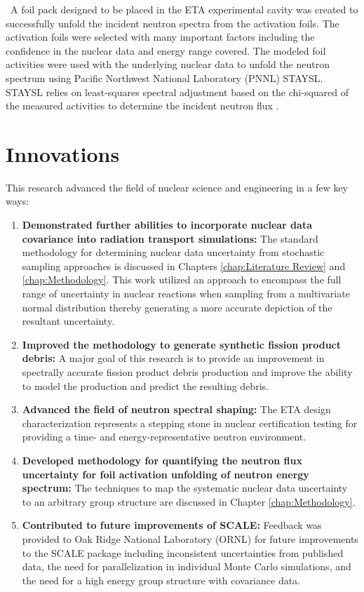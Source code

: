 \ A foil pack designed to be placed in the ETA experimental cavity was created to successfully unfold the incident neutron spectra from the activation foils. 
The activation foils were selected with many important factors including the confidence in the nuclear data and energy range covered. 
The modeled foil activities were used with the underlying nuclear data to unfold the neutron spectrum using Pacific Northwest National Laboratory (PNNL) STAYSL. 
STAYSL relies on least-squares spectral adjustment based on the chi-squared of the measured activities to determine the incident neutron flux \cite{Greenwood2016}. 

\section{Innovations}

This research advanced the field of nuclear science and engineering in a few key ways:

\begin{enumerate} 
\item \textbf{Demonstrated further abilities to incorporate nuclear data covariance into radiation transport simulations:}  
The standard methodology for determining nuclear data uncertainty from stochastic sampling approaches is discussed in Chapters \ref{chap:Literature Review} and \ref{chap:Methodology}. This work utilized an approach to encompass the full range of uncertainty in nuclear reactions when sampling from a multivariate normal distribution thereby generating a more accurate depiction of the resultant uncertainty. 
\item \textbf{Improved the methodology to generate synthetic fission product debris:}
A major goal of this research is to provide an improvement in spectrally accurate fission product debris production and improve the ability to model the production and predict the resulting debris. 
\item \textbf{Advanced the field of neutron spectral shaping:}
The ETA design characterization represents a stepping stone in nuclear certification testing for providing a time- and energy-representative neutron environment.
\item \textbf{Developed methodology for quantifying the neutron flux uncertainty for foil activation unfolding of neutron energy spectrum:}
The techniques to map the systematic nuclear data uncertainty to an arbitrary group structure are discussed in Chapter \ref{chap:Methodology}. 
\item \textbf{Contributed to future improvements of SCALE:}
Feedback was provided to Oak Ridge National Laboratory (ORNL) for future improvements to the SCALE package including inconsistent uncertainties from published data, the need for parallelization in individual Monte Carlo simulations, and the need for a high energy group structure with covariance data.  
\end{enumerate}

